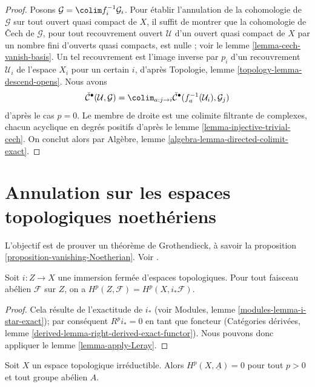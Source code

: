 \begin{proof}
Posons $\mathcal{G} = \colim f_i^{-1}\mathcal{G}_i$. Pour établir l'annulation de la cohomologie de $\mathcal{G}$ sur tout ouvert quasi compact de $X$, il suffit de montrer que la cohomologie de {\v C}ech de
$\mathcal{G}$, pour tout recouvrement ouvert $\mathcal{U}$ d'un ouvert quasi compact de
$X$ par un nombre fini d'ouverts quasi compacts, est nulle ; voir le lemme \ref{lemma-cech-vanish-basis}. Un tel recouvrement est l'image inverse par $p_i$ d'un recouvrement $\mathcal{U}_i$
de l'espace $X_i$ pour un certain $i$, d'après Topologie, lemme \ref{topology-lemma-descend-opens}. Nous avons
$$
\check{\mathcal{C}}^\bullet(\mathcal{U}, \mathcal{G}) =
\colim_{a : j \to i}
\check{\mathcal{C}}^\bullet(f_a^{-1}(\mathcal{U}_i), \mathcal{G}_j)
$$
d'après le cas $p = 0$. Le membre de droite est une colimite filtrante de complexes, chacun acyclique en degrés positifs d'après le lemme \ref{lemma-injective-trivial-cech}. On conclut alors par Algèbre, lemme \ref{algebra-lemma-directed-colimit-exact}.

\end{proof}
\section{Annulation sur les espaces topologiques noethériens}

\label{section-vanishing-Noetherian}

\noindent
L'objectif est de prouver un théorème de Grothendieck, à savoir la proposition \ref{proposition-vanishing-Noetherian}. Voir \cite{Tohoku}.

\begin{lemma}

\label{lemma-cohomology-and-closed-immersions}
Soit $i : Z \to X$ une immersion fermée d'espaces topologiques. Pour tout faisceau abélien $\mathcal{F}$ sur $Z$, on a $H^p(Z, \mathcal{F}) = H^p(X, i_*\mathcal{F})$.
\end{lemma}

\begin{proof}
Cela résulte de l'exactitude de $i_*$ (voir Modules, lemme \ref{modules-lemma-i-star-exact}); par conséquent $R^pi_* = 0$ en tant que foncteur (Catégories dérivées, lemme \ref{derived-lemma-right-derived-exact-functor}). Nous pouvons donc appliquer le lemme \ref{lemma-apply-Leray}.
\end{proof}

\begin{lemma}

\label{lemma-irreducible-constant-cohomology-zero}
Soit $X$ un espace topologique irréductible. Alors $H^p(X, \underline{A}) = 0$ pour tout $p > 0$ et tout groupe abélien $A$.
\end{lemma}

